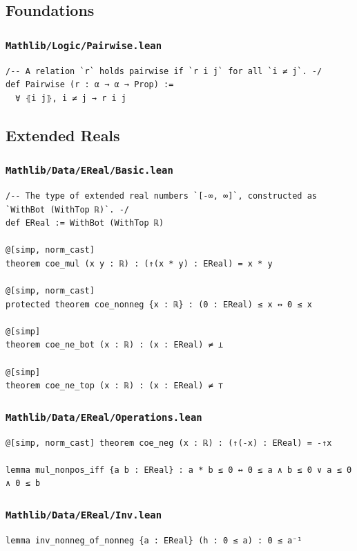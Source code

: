 \subsection{Foundations}

\subsubsection{\texttt{Mathlib/Logic/Pairwise.lean}}
\begin{lstlisting}[language=lean]
/-- A relation `r` holds pairwise if `r i j` for all `i ≠ j`. -/
def Pairwise (r : α → α → Prop) :=
  ∀ ⦃i j⦄, i ≠ j → r i j
\end{lstlisting}

\newpage
\subsection{Extended Reals}

\subsubsection{\texttt{Mathlib/Data/EReal/Basic.lean}}
\begin{lstlisting}[language=lean]
/-- The type of extended real numbers `[-∞, ∞]`, constructed as `WithBot (WithTop ℝ)`. -/
def EReal := WithBot (WithTop ℝ)

@[simp, norm_cast]
theorem coe_mul (x y : ℝ) : (↑(x * y) : EReal) = x * y

@[simp, norm_cast]
protected theorem coe_nonneg {x : ℝ} : (0 : EReal) ≤ x ↔ 0 ≤ x

@[simp]
theorem coe_ne_bot (x : ℝ) : (x : EReal) ≠ ⊥

@[simp]
theorem coe_ne_top (x : ℝ) : (x : EReal) ≠ ⊤
\end{lstlisting}

\subsubsection{\texttt{Mathlib/Data/EReal/Operations.lean}}
\begin{lstlisting}[language=lean]
@[simp, norm_cast] theorem coe_neg (x : ℝ) : (↑(-x) : EReal) = -↑x

lemma mul_nonpos_iff {a b : EReal} : a * b ≤ 0 ↔ 0 ≤ a ∧ b ≤ 0 ∨ a ≤ 0 ∧ 0 ≤ b
\end{lstlisting}

\subsubsection{\texttt{Mathlib/Data/EReal/Inv.lean}}
\begin{lstlisting}[language=lean]
lemma inv_nonneg_of_nonneg {a : EReal} (h : 0 ≤ a) : 0 ≤ a⁻¹
\end{lstlisting}

